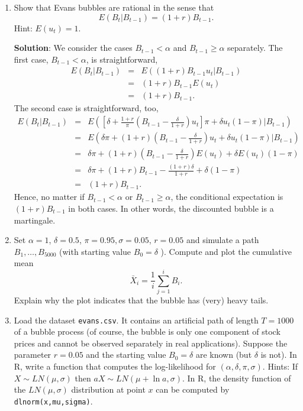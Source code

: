 \documentclass{article}
\begin{document}
\begin{enumerate}
\item Show that Evans bubbles are rational in the sense that%
\begin{equation*}
E(B_{t}|B_{t-1})=(1+r)B_{t-1}.
\end{equation*}%
Hint: $E(u_{t})=1$.

\textbf{Solution}: We consider the cases $B_{t-1}<\alpha $ and $B_{t-1}\geq
\alpha $ separately. The first case, $B_{t-1}<\alpha $, is straightforward,%
\begin{eqnarray*}
E\left( B_{t}|B_{t-1}\right)  &=&E\left( \left( 1+r\right)
B_{t-1}u_{t}|B_{t-1}\right)  \\
&=&\left( 1+r\right) B_{t-1}E(u_{t}) \\
&=&\left( 1+r\right) B_{t-1}.
\end{eqnarray*}%
The second case is straightforward, too,%
\begin{eqnarray*}
E\left( B_{t}|B_{t-1}\right)  &=&E\left( \left[ \delta +\frac{1+r}{\pi }%
\left( B_{t-1}-\frac{\delta }{1+r}\right) u_{t}\right] \pi +\delta
u_{t}\left( 1-\pi \right) |B_{t-1}\right)  \\
&=&E\left( \delta \pi +\left( 1+r\right) \left( B_{t-1}-\frac{\delta }{1+r}%
\right) u_{t}+\delta u_{t}\left( 1-\pi \right) |B_{t-1}\right)  \\
&=&\delta \pi +\left( 1+r\right) \left( B_{t-1}-\frac{\delta }{1+r}\right)
E\left( u_{t}\right) +\delta E\left( u_{t}\right) \left( 1-\pi \right)  \\
&=&\delta \pi +\left( 1+r\right) B_{t-1}-\frac{\left( 1+r\right) \delta }{1+r%
}+\delta \left( 1-\pi \right)  \\
&=&\left( 1+r\right) B_{t-1}.
\end{eqnarray*}%
Hence, no matter if $B_{t-1}<\alpha $ or $B_{t-1}\geq \alpha $, the
conditional expectation is $\left( 1+r\right) B_{t-1}$ in both cases. In
other words, the discounted bubble is a martingale.

\item Set $\alpha =1$, $\delta =0.5$, $\pi =0.95,\sigma =0.05$, $r=0.05$ and
simulate a path $B_{1},\ldots ,B_{5000}$ (with starting value $B_{0}=\delta $%
). Compute and plot the cumulative mean%
\begin{equation*}
\bar{X}_{i}=\frac{1}{i}\sum_{j=1}^{i}B_{i}.
\end{equation*}%
Explain why the plot indicates that the bubble has (very) heavy tails.

\item Load the dataset \texttt{evans.csv}. It contains an artificial path of
length $T=1000$ of a bubble process (of course, the bubble is only one
component of stock prices and cannot be observed separately in real
applications). Suppose the parameter $r=0.05$ and the starting value $%
B_{0}=\delta $ are known (but $\delta $ is not). In R, write a function that
computes the log-likelihood for $(\alpha ,\delta ,\pi ,\sigma )$. Hints: If $%
X\sim LN(\mu ,\sigma )$ then $aX\sim LN(\mu +\ln a,\sigma )$. In R, the
density function of the $LN(\mu ,\sigma )$ distribution at point $x$ can be
computed by \texttt{dlnorm(x,mu,sigma)}.


\end{enumerate}
\end{document}
